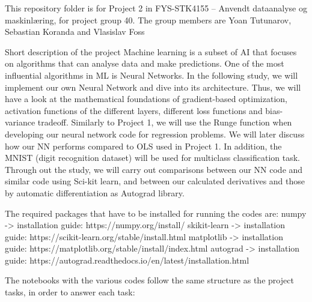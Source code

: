 This repository folder is for Project 2 in FYS-STK4155 – Anvendt dataanalyse og maskinlæring, for project group 40. 
The group members are Yoan Tutunarov, Sebastian Koranda and Vlasislav Foss

Short description of the project
Machine learning is a subset of AI that focuses on algorithms that can analyse data and make predictions. One of the most influential 
algorithms in ML is Neural Networks. In the following study, we will implement our own Neural Network and dive into its architecture.
Thus, we will have a look at the mathematical foundations of gradient-based optimization, activation functions of the different layers, 
different loss functions and bias-variance tradeoff.
Similarly to Project 1, we will use the Runge function when developing our neural network code for regression problems. We will later 
discuss how our NN performs compared to OLS used in Project 1. 
In addition, the MNIST (digit recognition dataset) will be used for multiclass classification task. 
Through out the study, we will carry out comparisons between our NN code and similar code using Sci-kit learn, and between our calculated
derivatives and those by automatic differentiation as Autograd library. 

The required packages that have to be installed for running the codes are: 
numpy -> installation guide:  https://numpy.org/install/
skikit-learn -> installation guide:  https://scikit-learn.org/stable/install.html
matplotlib -> installation guide:  https://matplotlib.org/stable/install/index.html
autograd -> installation guide:  https://autograd.readthedocs.io/en/latest/installation.html

The notebooks with the various codes follow the same structure as the project tasks, in order to answer each task: 
